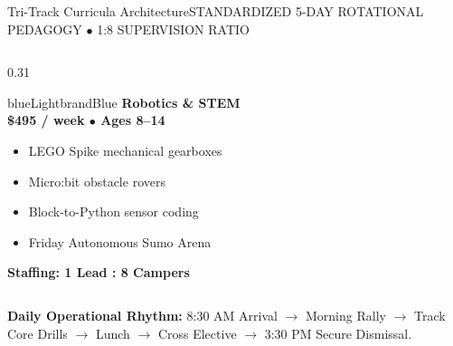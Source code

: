 \documentclass[aspectratio=169,9pt]{beamer}
\begin{document}
\begin{frame}{Tri-Track Curricula Architecture}{STANDARDIZED 5-DAY ROTATIONAL PEDAGOGY $\bullet$ 1:8 SUPERVISION RATIO}
\begin{columns}[T]
  \begin{column}{0.31\textwidth}
    \begin{execbox}{blueLight}{brandBlue}
      \textcolor{brandBlue}{\textbf{\scriptsize Robotics \& STEM}} \\[1pt]
      \textbf{\tiny \$495 / week $\bullet$ Ages 8--14} \\[2pt]
      \tiny
      \begin{itemize}
        \item LEGO Spike mechanical gearboxes
        \item Micro:bit obstacle rovers
        \item Block-to-Python sensor coding
        \item Friday Autonomous Sumo Arena
      \end{itemize}
      \vskip2pt
      \textcolor{brandBlue}{\textbf{\tiny Staffing: 1 Lead : 8 Campers}}
    \end{execbox}
  \end{column}
\end{columns}

\vskip4pt
\begin{center}
  \textcolor{brandSlate}{\tiny \textbf{Daily Operational Rhythm:} 8:30 AM Arrival $\rightarrow$ Morning Rally $\rightarrow$ Track Core Drills $\rightarrow$ Lunch $\rightarrow$ Cross Elective $\rightarrow$ 3:30 PM Secure Dismissal.}
\end{center}

\end{frame}
\end{document}
